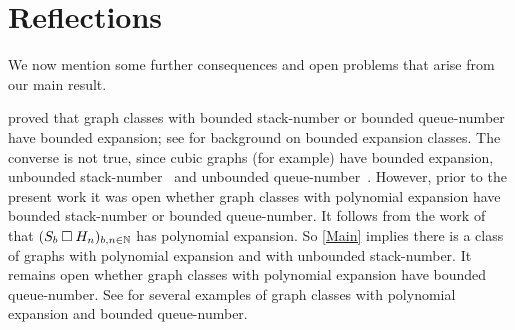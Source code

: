 \documentclass[kpfonts]{patmorin}
\newcommand{\CartProd}{\mathbin{\square}}
\begin{document}
\section{Reflections}

We now mention some further consequences and open problems that arise from our main result. 

\citet{NOW11} proved that graph classes with bounded stack-number or bounded queue-number have bounded expansion; see \citep{Sparsity} for background on bounded expansion classes. The converse is not true, since cubic graphs (for example) have bounded expansion, unbounded stack-number~\citep{Malitz94a} and unbounded queue-number~\citep{Wood-QueueDegree}. However, prior to the present work it was open whether graph classes with polynomial expansion have bounded stack-number or bounded queue-number. It follows from the work of \citet[Theorem~19]{DHJLW21} that $(S_b \CartProd H_n)_{b,n\in\N}$ has polynomial expansion. So \cref{Main} implies there is a class of graphs with polynomial expansion and with unbounded stack-number. It remains open whether graph classes with polynomial expansion have bounded queue-number. See \citep{DJMMUW20,DMW} for several examples of graph classes with polynomial expansion and bounded queue-number.

\end{document}
